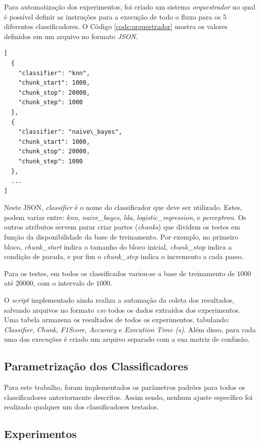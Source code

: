 \documentclass[12pt]{article}
\begin{document}
Para automatização dos experimentos, foi criado um sistema \textit{orquestrador} no qual é possível definir as instruções para a execução de todo o fluxo para os 5 diferentes classificadores. O Código \ref{code:orquestrador} mostra os valores definidos em um arquivo no formato \textit{JSON}.

\begin{lstlisting}[caption={JSON do Orquestrador},captionpos=b,frame=single,label={code:orquestrador}]
[
  {
    "classifier": "knn",
    "chunk_start": 1000,
    "chunk_stop": 20000,
    "chunk_step": 1000
  },
  {
    "classifier": "naive\_bayes",
    "chunk_start": 1000,
    "chunk_stop": 20000,
    "chunk_step": 1000
  },
  ...
]
\end{lstlisting}

Neste JSON, \textit{classifier} é o nome do classificador que deve ser utilizado. Estes, podem variar entre: \textit{knn}, \textit{naive\_bayes}, \textit{lda}, \textit{logistic\_regression}, e \textit{perceptron}. Os outros atributos servem parar criar partes (\textit{chunks}) que dividem os testes em função da disponibilidade da base de treinamento. Por exemplo, no primeiro bloco, \textit{chunk\_start} indica o tamanho do bloco inicial, \textit{chunk\_stop} indica a condição de parada, e por fim o \textit{chunk\_step} indica o incremento a cada passo.

Para os testes, em todos os classificados variou-se a base de treinamento de $1000$ até $20000$, com o intervalo de $1000$.

O \textit{script} implementado ainda realiza a automação da coleta dos resultados, salvando arquivos no formato \textit{csv} todos os dados extraídos dos experimentos. Uma tabela armazena os resultados de todos os experimentos, tabulando: \textit{Classifier}, \textit{Chunk}, \textit{F1Score}, \textit{Accuracy} e \textit{Execution Time (s)}. Além disso, para cada uma das execuções é criado um arquivo separado com a sua matriz de confusão.

\subsection{Parametrização dos Classificadores}

Para este trabalho, foram implementados os parâmetros padrões para todos os classificadores anteriormente descritos. Assim sendo, nenhum ajuste específico foi realizado qualquer um dos classificadores testados.

\subsection{Experimentos}
\end{document}
